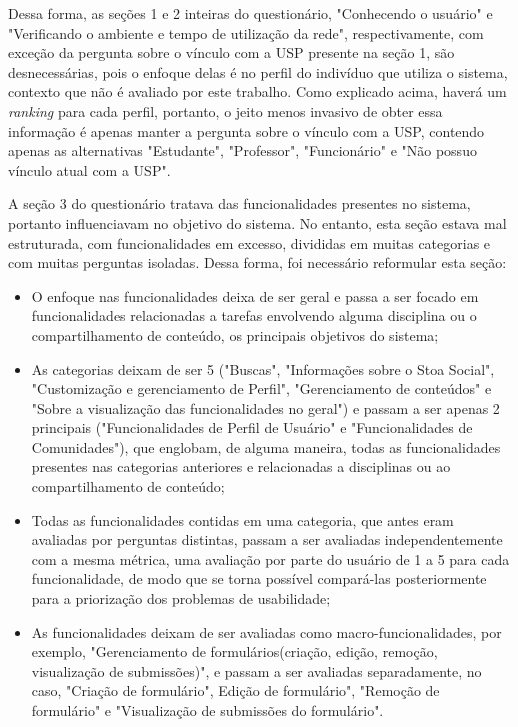    Dessa forma, as seções 1 e 2 inteiras do questionário, "Conhecendo o usuário" e "Verificando o ambiente e tempo de utilização da rede", respectivamente, com exceção da pergunta sobre o vínculo com a USP presente na seção 1, são desnecessárias, pois o enfoque delas é no perfil do indivíduo que utiliza o sistema, contexto que não é avaliado por este trabalho. Como explicado acima, haverá um \emph{ranking} para cada perfil, portanto, o jeito menos invasivo de obter essa informação é apenas manter a pergunta sobre o vínculo com a USP, contendo apenas as alternativas "Estudante", "Professor", "Funcionário" e "Não possuo vínculo atual com a USP".



    A seção 3 do questionário tratava das funcionalidades presentes no sistema, portanto influenciavam no objetivo do sistema. No entanto, esta seção estava mal estruturada, com funcionalidades em excesso, divididas em muitas categorias e com muitas perguntas isoladas. Dessa forma, foi necessário reformular esta seção: 

\begin{itemize}
\item O enfoque nas funcionalidades deixa de ser geral e passa a ser focado em funcionalidades relacionadas a tarefas envolvendo alguma disciplina ou o compartilhamento de conteúdo, os principais objetivos do sistema; 

\item As categorias deixam de ser 5 ("Buscas", "Informações sobre o Stoa Social", "Customização e gerenciamento de Perfil", "Gerenciamento de conteúdos" e "Sobre a visualização das funcionalidades no geral") e passam a ser apenas 2 principais ("Funcionalidades de Perfil de Usuário"  e "Funcionalidades de Comunidades"), que englobam, de alguma maneira, todas as funcionalidades presentes nas categorias anteriores e relacionadas a disciplinas ou ao compartilhamento de conteúdo;

\item Todas as funcionalidades contidas em uma categoria, que antes eram avaliadas por perguntas distintas, passam a ser avaliadas independentemente com a mesma métrica, uma avaliação por parte do usuário de 1 a 5 para cada funcionalidade, de modo que se torna possível compará-las posteriormente para a priorização dos problemas de usabilidade;

\item As funcionalidades deixam de ser avaliadas como macro-funcionalidades, por exemplo, "Gerenciamento de formulários(criação, edição, remoção, visualização de submissões)", e passam a ser avaliadas separadamente, no caso, "Criação de formulário", Edição de formulário", "Remoção de formulário" e "Visualização de submissões do formulário".

\end{itemize}



